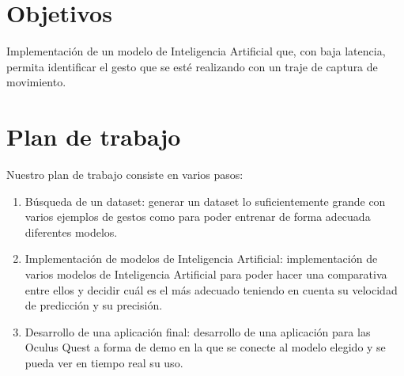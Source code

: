 \section{Objetivos}
Implementación de un modelo de Inteligencia Artificial que, con baja latencia, permita identificar el gesto que se esté realizando con un traje de captura de movimiento.

\section{Plan de trabajo}
Nuestro plan de trabajo consiste en varios pasos:
\begin{enumerate}
	\item Búsqueda de un dataset: generar un dataset lo suficientemente grande con varios ejemplos de gestos como para poder entrenar de forma adecuada diferentes modelos.
	\item Implementación de modelos de Inteligencia Artificial: implementación de varios modelos de Inteligencia Artificial para poder hacer una comparativa entre ellos y decidir cuál es el más adecuado teniendo en cuenta su velocidad de predicción y su precisión.
	\item Desarrollo de una aplicación final: desarrollo de una aplicación para las Oculus Quest a forma de demo en la que se conecte al modelo elegido y se pueda ver en tiempo real su uso.
\end{enumerate}
